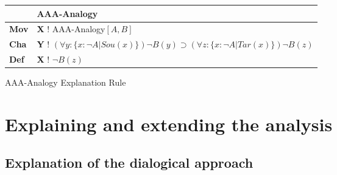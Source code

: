 					\begin{Scheme}[H]\footnotesize
               		\centering
               		\begin{tabular}{l l}
               			                   & \textbf{AAA-Analogy}                                                                                                                                                                                                                                                                               \\ \toprule
               			\textbf{Mov}      & \textbf{X} ! AAA-Analogy$[A,B]$                                                                                                                                                                                                                                                                                     \\ \midrule
               			\textbf{Cha} & \textbf{Y} ! $(\forall y: \{ x: \neg A| Sou(x)\} ) \neg B(y) \supset (\forall z : \{ x: \neg A| Tar(x)\} ) \neg B(z)$                                                                                                                                                                                                                                                                                         \\ \midrule
               			\textbf{Def}   & \textbf{X} ! $\neg B(z)$ \\ \bottomrule
               		\end{tabular}
               		\caption{AAA-Analogy Explanation Rule}
               		\label{AAAAnalogyExplanation}
					\end{Scheme}
				
	\newpage
	\section{Explaining and extending the analysis}
	
		\subsection{Explanation of the dialogical approach}
		
